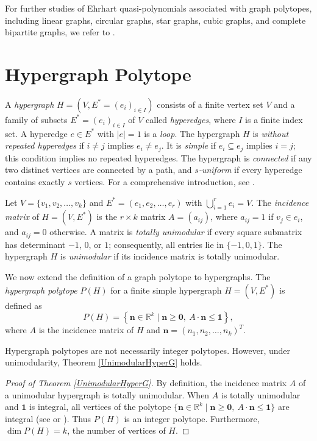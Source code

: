 \documentclass[reqno, 12pt]{amsart}
\theoremstyle{mydefinition}
\theoremstyle{myremark}
\begin{document}
For further studies of Ehrhart quasi-polynomials associated with graph polytopes, including linear graphs, circular graphs, star graphs, cubic graphs, and complete bipartite graphs, we refer to \cite{BonaJu07,Ju07,XinZhong23}.



\section{Hypergraph Polytope}\label{Section33}

A \emph{hypergraph} $H = (V, E^* = (e_i)_{i \in I})$ consists of a finite vertex set $V$ and a family of subsets $E^* = (e_i)_{i \in I}$ of $V$ called \emph{hyperedges}, where $I$ is a finite index set. A hyperedge $e \in E^*$ with $|e| = 1$ is a \emph{loop}. The hypergraph $H$ is \emph{without repeated hyperedges} if $i \neq j$ implies $e_i \neq e_j$. It is \emph{simple} if $e_i \subseteq e_j$ implies $i = j$; this condition implies no repeated hyperedges. The hypergraph is \emph{connected} if any two distinct vertices are connected by a path, and \emph{$s$-uniform} if every hyperedge contains exactly $s$ vertices. For a comprehensive introduction, see \cite{Bretto}.

Let $V = \{v_1, v_2, \dots, v_k\}$ and $E^* = (e_1, e_2, \dots, e_r)$ with $\bigcup_{i=1}^r e_i = V$. The \emph{incidence matrix} of $H = (V, E^*)$ is the $r \times k$ matrix $A = (a_{ij})$, where $a_{ij} = 1$ if $v_j \in e_i$, and $a_{ij} = 0$ otherwise. A matrix is \emph{totally unimodular} if every square submatrix has determinant $-1$, $0$, or $1$; consequently, all entries lie in $\{-1, 0, 1\}$. The hypergraph $H$ is \emph{unimodular} if its incidence matrix is totally unimodular.

We now extend the definition of a graph polytope to hypergraphs. The \emph{hypergraph polytope} $P(H)$ for a finite simple hypergraph $H = (V, E^*)$ is defined as
\[
P(H) = \left\{ \mathbf{n} \in \mathbb{R}^k \mid \mathbf{n} \geq \mathbf{0},\  A\cdot \mathbf{n} \leq \mathbf{1} \right\},
\]
where $A$ is the incidence matrix of $H$ and $\mathbf{n} = (n_1, n_2, \dots, n_k)^T$.

Hypergraph polytopes are not necessarily integer polytopes. However, under unimodularity, Theorem \ref{UnimodularHyperG} holds.
\begin{proof}[Proof of Theorem \ref{UnimodularHyperG}]
By definition, the incidence matrix $A$ of a unimodular hypergraph is totally unimodular. When $A$ is totally unimodular and $\mathbf{1}$ is integral, all vertices of the polytope $\{\mathbf{n} \in \mathbb{R}^k \mid \mathbf{n} \geq \mathbf{0},\ A\cdot\mathbf{n} \leq \mathbf{1}\}$ are integral (see \cite[Chapter 19]{Schrijver} or \cite{Baldoni04}). Thus $P(H)$ is an integer polytope. Furthermore, $\dim P(H) = k$, the number of vertices of $H$.
\end{proof}
\end{document}
